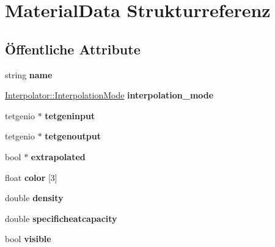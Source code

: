 \hypertarget{structMaterialData}{\section{Material\-Data Strukturreferenz}
\label{structMaterialData}
}
\subsection*{Öffentliche Attribute}
\begin{DoxyCompactItemize}
\item 
\hypertarget{structMaterialData_abed2d9d9a5fe1f943ce15bd70269821f}{string {\bfseries name}}\label{structMaterialData_abed2d9d9a5fe1f943ce15bd70269821f}

\item 
\hypertarget{structMaterialData_a1a1617f0b9af140e7fcfebcafbc31811}{\hyperlink{classInterpolator_adb733b1439a2903feae57fa734ced0c2}{Interpolator\-::\-Interpolation\-Mode} {\bfseries interpolation\-\_\-mode}}\label{structMaterialData_a1a1617f0b9af140e7fcfebcafbc31811}

\item 
\hypertarget{structMaterialData_a1fac74787550c36c067767c59980e906}{tetgenio $\ast$ {\bfseries tetgeninput}}\label{structMaterialData_a1fac74787550c36c067767c59980e906}

\item 
\hypertarget{structMaterialData_a4ba6f20dc660f07086c5138c25c8896c}{tetgenio $\ast$ {\bfseries tetgenoutput}}\label{structMaterialData_a4ba6f20dc660f07086c5138c25c8896c}

\item 
\hypertarget{structMaterialData_ad9240e0397d480726a5b1d7572315404}{bool $\ast$ {\bfseries extrapolated}}\label{structMaterialData_ad9240e0397d480726a5b1d7572315404}

\item 
\hypertarget{structMaterialData_a22f2657161fd4046ffe87e0db8799aa1}{float {\bfseries color} \mbox{[}3\mbox{]}}\label{structMaterialData_a22f2657161fd4046ffe87e0db8799aa1}

\item 
\hypertarget{structMaterialData_a29e7d06d84da7d405b09fcf61e033e17}{double {\bfseries density}}\label{structMaterialData_a29e7d06d84da7d405b09fcf61e033e17}

\item 
\hypertarget{structMaterialData_aa2781718b37c874f6a406252299f13ef}{double {\bfseries specificheatcapacity}}\label{structMaterialData_aa2781718b37c874f6a406252299f13ef}

\item 
\hypertarget{structMaterialData_aee02870655070aac2f7e14e2f6cd2a71}{bool {\bfseries visible}}\label{structMaterialData_aee02870655070aac2f7e14e2f6cd2a71}

\end{DoxyCompactItemize}


